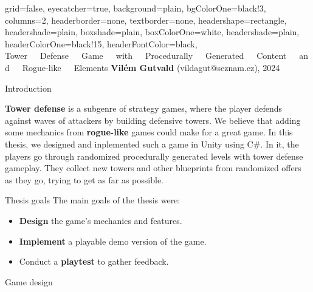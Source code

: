 \documentclass[portrait,fontscale=0.35,paperwidth=840mm,paperheight=1185mm]{baposter}
\begin{document}
\color{black!80} %
\begin{poster}{grid=false,
        eyecatcher=true,
        background=plain,
        bgColorOne=black!3, %
        columns=2,
        headerborder=none,
        textborder=none,
        headershape=rectangle,
        headershade=plain,
        boxshade=plain,
        boxColorOne=white,
        headershade=plain,
        headerColorOne=black!15, %
        headerFontColor=black,
    }%
    {}
    {\fontsize{13mm}{16mm}\selectfont Tower\ \ \ Defense\ \ \ Game\ \ \ with\ \ \ Procedurally\ \ \ Generated\ \ \ Content\ \ \ and\ \ \ Rogue-like\ \ \ Elements}
    {\vspace{1ex} \textbf{Vilém Gutvald} (vildagut@seznam.cz), 2024}
    {}



    \begin{posterbox}[column=0,name=background]{Introduction}

        \textbf{Tower defense} is a subgenre of strategy games, where the player defends against waves of attackers by building defensive towers.
        We believe that adding some mechanics from \textbf{rogue-like} games could make for a great game.
        In this thesis, we designed and inplemented such a game in Unity using C\#.
        In it, the players go through randomized procedurally generated levels with tower defense gameplay.
        They collect new towers and other blueprints from randomized offers as they go, trying to get as far as possible.
    \end{posterbox}

    \begin{posterbox}[column=0, name=goals, below=background, headerColorOne=cyan!60, boxColorOne=cyan!20]{Thesis goals}
        The main goals of the thesis were:
        \begin{itemize}[itemsep=-0.15cm,topsep=2pt]
            \item \textbf{Design} the game's mechanics and features.
            \item \textbf{Implement} a playable demo version of the game.
            \item Conduct a \textbf{playtest} to gather feedback.
        \end{itemize}
    \end{posterbox}

    \begin{posterbox}[column=0,name=design, below=goals]{Game design}


\end{posterbox}
\end{poster}
\end{document}
